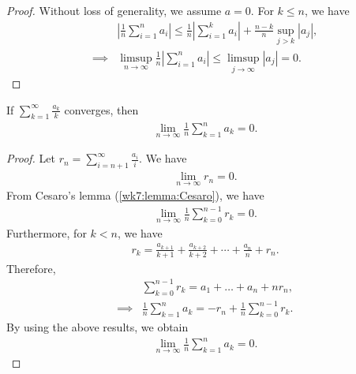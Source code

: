 \documentclass[../aipt.tex]{subfiles}
\begin{document}
\begin{proof}
Without loss of generality, we assume $a = 0$. For $k \leq n$, we have
\begin{align*}
&\left| \frac{1}{n} \sum_{i=1}^n a_i\right|
\leq \frac{1}{n} \left|\sum_{i=1}^k a_i\right| + \frac{n-k}{n} \sup_{j>k} |a_j|, \\
\implies
&\limsup_{n \to \infty}\frac{1}{n} \left|\sum_{i=1}^n a_i\right| \leq \limsup_{j \to \infty} |a_j| = 0.
\end{align*}
\end{proof}
%
\begin{Lemma} \label{wk7:lemma:Kronecker}
If $\displaystyle\sum_{k = 1}^{\infty} \frac{a_k}{k}$ converges, then 
\begin{align*}
\lim_{n \to \infty} \frac{1}{n} \sum_{k = 1}^{n} a_k = 0.
\end{align*}
\end{Lemma}
%
\begin{proof}
Let $r_n = \displaystyle\sum_{i = n+1}^{\infty} \frac{a_i}{i}$. We have
\begin{align*}
\lim_{n \to \infty} r_n = 0.
\end{align*}
From Cesaro's lemma (\cref{wk7:lemma:Cesaro}), we have
\begin{align*}
\lim_{n \to \infty} \frac{1}{n} \sum_{k=0}^{n-1} r_k = 0.
\end{align*}
Furthermore, for $k<n$, we have
\begin{align*}
r_k = \frac{a_{k+1}}{k+1} + \frac{a_{k+2}}{k+2} + \cdots + \frac{a_{n}}{n} + r_n.
\end{align*}
Therefore,
\begin{align*}
&\sum_{k=0}^{n-1} r_k = a_1 + \ldots + a_n + n r_n, \\
\implies
&\frac{1}{n} \sum_{k=1}^{n} a_k = -r_n + \frac{1}{n} \sum_{k=0}^{n-1} r_k.
\end{align*}
By using the above results, we obtain
\begin{align*}
\lim_{n \to \infty} \frac{1}{n} \sum_{k=1}^{n} a_k = 0.
\end{align*}
\end{proof}
%
\end{document}
